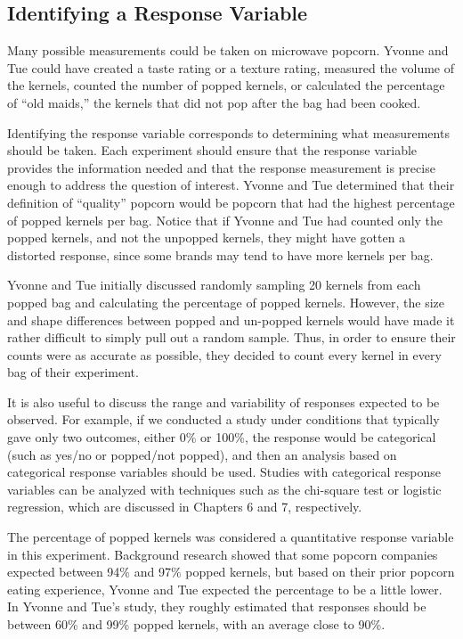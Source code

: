 \documentclass[
]{book}
\begin{document}
\hypertarget{identifying-a-response-variable}{%
\subsection*{Identifying a Response Variable}\label{identifying-a-response-variable}}

Many possible measurements could be taken on microwave popcorn. Yvonne and Tue could have created a taste rating or a texture rating, measured the volume of the kernels, counted the number of popped kernels, or calculated the percentage of ``old maids,'' the kernels that did not pop after the bag had been cooked.

Identifying the response variable corresponds to determining what measurements should be taken. Each experiment should ensure that the response variable provides the information needed and that the response measurement is precise enough to address the question of interest. Yvonne and Tue determined that their definition of ``quality'' popcorn would be popcorn that had the highest percentage of popped kernels per bag. Notice that if Yvonne and Tue had counted only the popped kernels, and not the unpopped kernels, they might have gotten a distorted response, since some brands may tend to have more kernels per bag.

Yvonne and Tue initially discussed randomly sampling 20 kernels from each popped bag and calculating the percentage of popped kernels. However, the size and shape differences between popped and un-popped kernels would have made it rather difficult to simply pull out a random sample. Thus, in order to ensure their counts were as accurate as possible, they decided to count every kernel in every bag of their experiment.

It is also useful to discuss the range and variability of responses expected to be observed. For example, if we conducted a study under conditions that typically gave only two outcomes, either 0\% or 100\%, the response would be categorical (such as yes/no or popped/not popped), and then an analysis based on categorical response variables should be used. Studies with categorical response variables can be analyzed with techniques such as the chi-square test or logistic regression, which are discussed in Chapters 6 and 7, respectively.

The percentage of popped kernels was considered a quantitative response variable in this experiment. Background research showed that some popcorn companies expected between 94\% and 97\% popped kernels, but based on their prior popcorn eating experience, Yvonne and Tue expected the percentage to be a little lower. In Yvonne and Tue's study, they roughly estimated that responses should be between 60\% and 99\% popped kernels, with an average close to 90\%.
\end{document}

